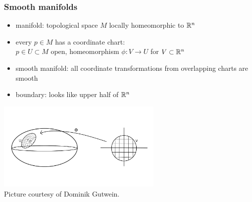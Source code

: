 \begin{frame}
  \frametitle{Smooth manifolds}
  \begin{itemize}
    \item manifold:  topological space $M$ locally homeomorphic to $\mathbb{R}^n$

    \item every $p\in M$ has a coordinate chart:\\$p\in U\subset M$ open, homeomorphism $\phi\colon V\to U$ for $V\subset \mathbb{R}^n$

    \item smooth manifold: all coordinate transformations from overlapping charts are smooth
    \item boundary: looks like upper half of $\mathbb{R}^n$
  \end{itemize}
  \includegraphics[width=8cm]{images/surface_with_chart.png}\\
  \tiny{Picture courtesy of Dominik Gutwein.}
\end{frame}

